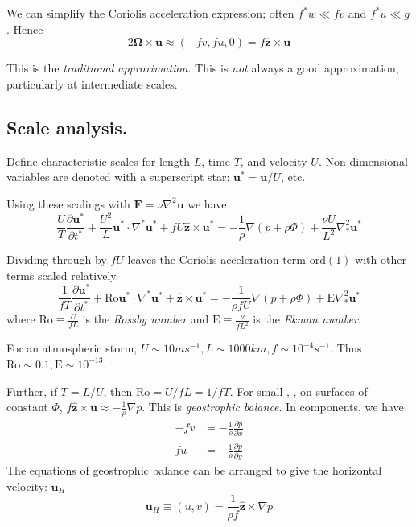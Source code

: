 \documentclass{jknotes}
\begin{document}
We can simplify the Coriolis acceleration expression; often $f^* w \ll f v$
and $f^* u \ll g$. Hence
\begin{equation}
	2 \symbf{\Omega} \times \symbf{u} \approx (-fv, fu, 0) = f \hat{\symbf{z}} \times
	\symbf{u}
\end{equation}

This is the \emph{traditional approximation}. This is \emph{not} always a good
approximation, particularly at intermediate scales.

\subsection{Scale analysis.}
Define characteristic scales for length $L$, time $T$, and velocity $U$.
Non-dimensional variables are denoted with a superscript star: $\symbf{u}^* =
\symbf{u}/U$, etc.

Using these scalings with $\symbf{F} = \nu \nabla^2 \symbf{u}$ we have
\begin{equation}
	\frac{U}{T} \frac{\partial \symbf{u}^*}{\partial t^*} + \frac{U^2}{L}
	\symbf{u}^* \cdot \nabla^* \symbf{u}^* + fU \hat{\symbf{z}} \times \symbf{u}^* =
	-\frac{1}{\rho} \nabla \left(p + \rho \Phi\right) + \frac{\nu U}{L^2} \nabla_*^2
		\symbf{u}^*
\end{equation}

Dividing through by $fU$ leaves the Coriolis acceleration term $\text{ord}(1)$ with
other terms scaled relatively.
\begin{equation}
	\frac{1}{fT} \frac{\partial \symbf{u}^*}{\partial t^*} + \text{Ro}	\symbf{u}^*
	\cdot \nabla^* \symbf{u}^* + \hat{\symbf{z}} \times \symbf{u}^* =
	-\frac{1}{\rho f U} \nabla \left(p + \rho \Phi\right) + \text{E} \nabla_*^2
		\symbf{u}^*
\end{equation}
where $\text{Ro} \equiv \frac{U}{fL}$ is the \emph{Rossby number} and
$\text{E} \equiv \frac{\nu}{fL^2}$ is the \emph{Ekman number}.

\begin{eg}
	For an atmospheric storm, $U \sim 10 m s^{-1}, L \sim 1000 km, f \sim
	10^{-4} s^{-1}$. Thus $\text{Ro} \sim 0.1, \text{E} \sim 10^{-13}$.
\end{eg}

Further, if $T = L/U$, then $\text{Ro} = U/fL = 1/fT$. For small \Ro, \Ek, 
on surfaces of constant $\Phi$, $f \hat{\symbf{z}} \times \symbf{u} \approx
-\frac{1}{\rho}\nabla p$.  This is \emph{geostrophic balance}. In components,
we have
\begin{equation}
	\begin{aligned}
		-fv &= -\frac{1}{\rho}\frac{\partial p}{\partial x} \\
		fu &= -\frac{1}{\rho}\frac{\partial p}{\partial y}
	\end{aligned}
\end{equation}
The equations of geostrophic balance can be arranged to give the horizontal
velocity:
$\symbf{u}_H$
\begin{equation}
	\symbf{u}_H \equiv (u,v) = \frac{1}{\rho f} \hat{\symbf{z}} \times \nabla p
\end{equation}
\end{document}
